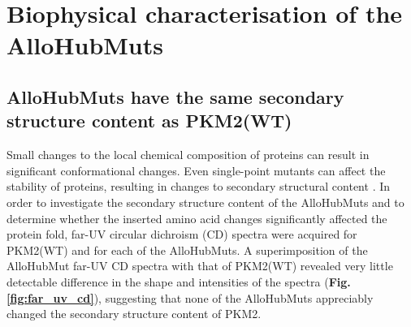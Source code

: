 \clearpage

\section{Biophysical characterisation of the AlloHubMuts}

\subsection{AlloHubMuts have the same secondary structure content as PKM2(WT)}
Small changes to the local chemical composition of proteins can result in significant conformational changes. Even single-point mutants can affect the stability of proteins, resulting in changes to secondary structural content \cite{Wang:2001aa}. In order to investigate the secondary structure content of the AlloHubMuts and to determine whether the inserted amino acid changes significantly affected the protein fold, far-UV circular dichroism (CD) spectra were acquired for PKM2(WT) and for each of the AlloHubMuts. A superimposition of the AlloHubMut far-UV CD spectra with that of PKM2(WT) revealed very little detectable difference in the shape and intensities of the spectra (\textbf{Fig. \ref{fig:far_uv_cd}}), suggesting that none of the AlloHubMuts appreciably changed the secondary structure content of PKM2. 
%
%
%

